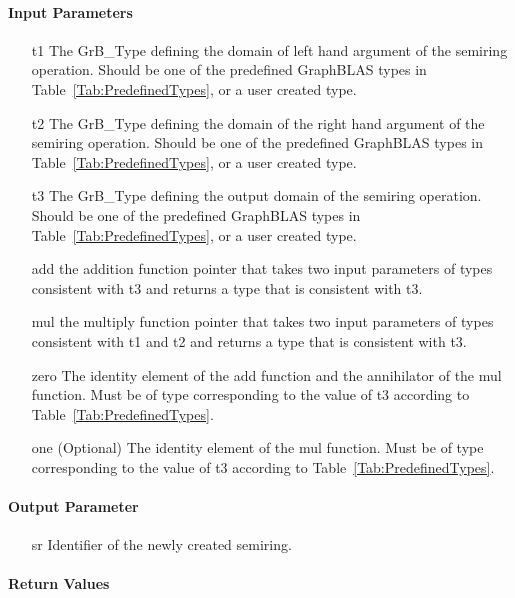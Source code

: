 \paragraph{Input Parameters}

\begin{itemize}[leftmargin=1.1in]
    \item[{\sf t1}] The {\sf GrB\_Type} defining the domain of left hand argument of
    the semiring operation. Should be one of the predefined
    GraphBLAS types in Table~\ref{Tab:PredefinedTypes}, or a user created type.
    \item[{\sf t2}] The {\sf GrB\_Type} defining the domain of the right hand argument of
    the semiring operation. Should be one of the predefined
    GraphBLAS types in Table~\ref{Tab:PredefinedTypes}, or a user created type.
    \item[{\sf t3}] The {\sf GrB\_Type} defining the output domain of the semiring
    operation. Should be one of the predefined
    GraphBLAS types in Table~\ref{Tab:PredefinedTypes}, or a user created type.
    \item[{\sf add}] the addition function pointer that takes two input parameters
    of types consistent with t3 and returns a type that is consistent with t3.
    \item[{\sf mul}] the multiply function pointer that takes two input parameters
    of types consistent with t1 and t2 and returns a type that is consistent with t3.
    \item[{\sf zero}] The identity element of the {\sf add} function and the annihilator
    of the {\sf mul} function.   Must be of type corresponding to the
    value of {\sf t3} according to Table~\ref{Tab:PredefinedTypes}.
    \item[{\sf one}] (Optional) The identity element of the {\sf mul} function. 
    Must be of type corresponding to the value of {\sf t3} according to
    Table~\ref{Tab:PredefinedTypes}.
\end{itemize}

\paragraph{Output Parameter}

\begin{itemize}[leftmargin=1.1in]
    \item[{\sf sr}] Identifier of the newly created semiring.
\end{itemize}


\paragraph{Return Values}

